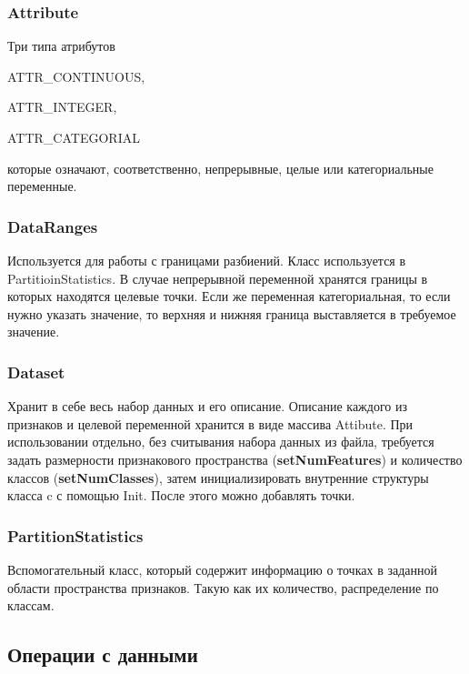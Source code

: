 \subsubsection*{Attribute}

Три типа атрибутов
\begin{DoxyItemize}
\item A\-T\-T\-R\-\_\-\-C\-O\-N\-T\-I\-N\-U\-O\-U\-S,
\item A\-T\-T\-R\-\_\-\-I\-N\-T\-E\-G\-E\-R,
\item A\-T\-T\-R\-\_\-\-C\-A\-T\-E\-G\-O\-R\-I\-A\-L
\end{DoxyItemize}

которые означают, соответственно, непрерывные, целые или категориальные переменные.

\subsubsection*{Data\-Ranges}

Используется для работы с границами разбиений. Класс используется в Partitioin\-Statistics. В случае непрерывной переменной хранятся границы в которых находятся целевые точки. Если же переменная категориальная, то если нужно указать значение, то верхняя и нижняя граница выставляется в требуемое значение.

\subsubsection*{Dataset}

Хранит в себе весь набор данных и его описание. Описание каждого из признаков и целевой переменной хранится в виде массива Attibute. При использовании отдельно, без считывания набора данных из файла, требуется задать размерности признакового пространства ({\bfseries set\-Num\-Features}) и количество классов ({\bfseries set\-Num\-Classes}), затем инициализировать внутренние структуры класса c с помощью Init. После этого можно добавлять точки.

\subsubsection*{Partition\-Statistics}

Вспомогательный класс, который содержит информацию о точках в заданной области пространства признаков. Такую как их количество, распределение по классам.

\subsection*{Операции с данными}

